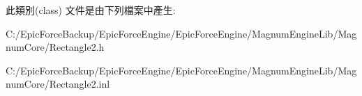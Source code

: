 此類別(class) 文件是由下列檔案中產生\+:\begin{DoxyCompactItemize}
\item 
C\+:/\+Epic\+Force\+Backup/\+Epic\+Force\+Engine/\+Epic\+Force\+Engine/\+Magnum\+Engine\+Lib/\+Magnum\+Core/Rectangle2.\+h\item 
C\+:/\+Epic\+Force\+Backup/\+Epic\+Force\+Engine/\+Epic\+Force\+Engine/\+Magnum\+Engine\+Lib/\+Magnum\+Core/Rectangle2.\+inl\end{DoxyCompactItemize}
